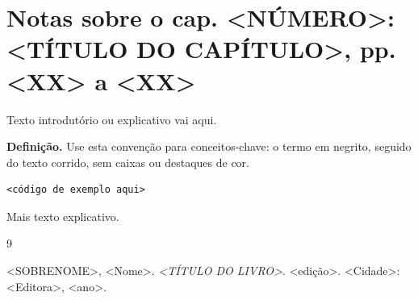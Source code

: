 \documentclass[12pt,a4paper]{article}
\newcommand{\termo}[1]{\textbf{#1.}}
\newcommand{\bookTitle}{<TÍTULO DO LIVRO>}
\newcommand{\fullReference}{%
	<SOBRENOME>, <Nome>. \textit{\bookTitle}. <edição>. <Cidade>: <Editora>, <ano>.%
}
\begin{document}
\section{Notas sobre o cap. <NÚMERO>: <TÍTULO DO CAPÍTULO>, pp. <XX> a <XX>}

Texto introdutório ou explicativo vai aqui.

\termo{Definição} Use esta convenção para conceitos-chave: o termo
em negrito, seguido do texto corrido, sem caixas ou destaques de cor.

\begin{lstlisting}
<código de exemplo aqui>
\end{lstlisting}

Mais texto explicativo.

\newpage
\begin{thebibliography}{9}

	\fullReference

\end{thebibliography}
\end{document}
